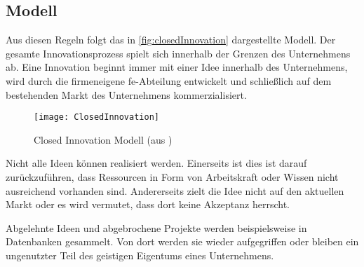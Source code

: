 \subsection{Modell}
Aus diesen Regeln folgt das in \autoref{fig:closedInnovation} dargestellte Modell.
Der gesamte Innovationsprozess spielt sich innerhalb der Grenzen des Unternehmens ab.
Eine Innovation beginnt immer mit einer Idee innerhalb des Unternehmens,
wird durch die firmeneigene \ac{fe}-Abteilung entwickelt
und schließlich auf dem bestehenden Markt des Unternehmens kommerzialisiert.

\begin{figure}[ht!]
    \centering
    \texttt{[image: ClosedInnovation]}
    \caption{Closed Innovation Modell (aus \cite[20]{herzog2011})}
    \label{fig:closedInnovation}
\end{figure}

Nicht alle Ideen können realisiert werden.
Einerseits ist dies ist darauf zurückzuführen, dass Ressourcen in Form von Arbeitskraft oder Wissen nicht ausreichend vorhanden sind.
Andererseits zielt die Idee nicht auf den aktuellen Markt oder es wird vermutet, dass dort keine Akzeptanz herrscht.

Abgelehnte Ideen und abgebrochene Projekte werden beispielsweise in Datenbanken gesammelt.
Von dort werden sie wieder aufgegriffen
oder bleiben ein ungenutzter Teil des geistigen Eigentums eines Unternehmens.


